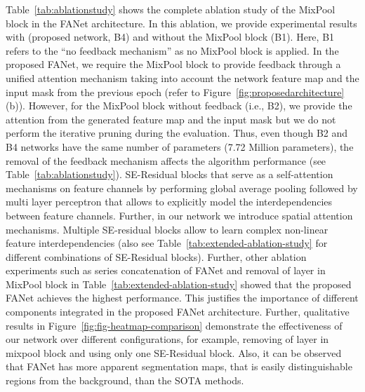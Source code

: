 \documentclass[journal]{IEEEtran}
\begin{document}
Table~\ref{tab:ablationstudy} shows the complete ablation study of the MixPool block in the FANet architecture. In this ablation, we provide experimental results with (proposed network, B4) and without the MixPool block (B1). Here, B1 refers to the ``no feedback mechanism'' as no MixPool block is applied. In the proposed FANet, we require the MixPool block to provide feedback through a unified attention mechanism taking into account the network feature map and the input mask from the previous epoch (refer to Figure~\ref{fig:proposedarchitecture} (b)). However, for the MixPool block without feedback (i.e., B2), we provide the attention from the generated feature map and the input mask but we do not perform the iterative pruning during the evaluation. Thus, even though B2 and B4 networks have the same number of parameters {(7.72 Million parameters)}, the removal of the feedback mechanism affects the algorithm performance (see Table~\ref{tab:ablationstudy}). SE-Residual blocks that serve as a self-attention mechanisms on feature channels by performing global average pooling followed by multi layer perceptron that allows to explicitly model the interdependencies between feature channels. Further, in our network we introduce spatial attention mechanisms. Multiple SE-residual blocks allow to learn complex non-linear feature interdependencies (also see Table~\ref{tab:extended-ablation-study} for different combinations of SE-Residual blocks).
Further, other ablation experiments such as series concatenation of FANet and removal of  layer in MixPool block in Table~\ref{tab:extended-ablation-study} showed that the proposed FANet achieves the highest performance. This justifies the importance of different components integrated in the proposed FANet architecture. {Further, qualitative results in Figure~\ref{fig:fig-heatmap-comparison} demonstrate the effectiveness of our network over different configurations, for example, removing of  layer in mixpool block and using only one SE-Residual block. Also, it can be observed that FANet has more apparent segmentation maps, that is easily distinguishable regions from the background, than the SOTA methods.} 
\end{document}
